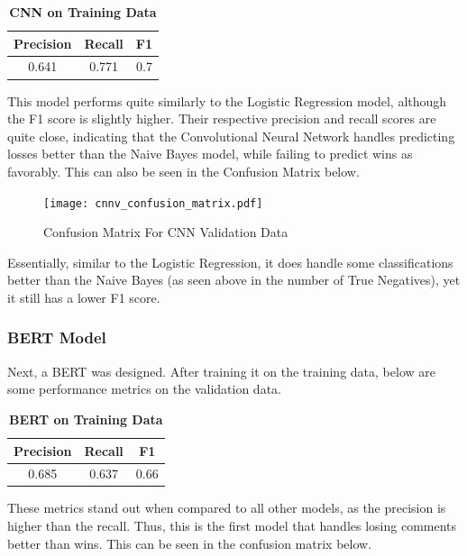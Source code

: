 \documentclass[twocolumn]{article}
\begin{document}
\begin{table}[H]
\centering %
\caption{\textbf{CNN on Training Data}} 

\begin{tabular}{ccc} 
\toprule
Precision & Recall & F1 \\ 
\midrule
0.641 & 0.771 & 0.7 \\
\bottomrule
\end{tabular}
\end{table}

This model performs quite similarly to the Logistic Regression model, although the F1 score is slightly higher. Their respective precision and recall scores are quite close, indicating that the Convolutional Neural Network handles predicting losses better than the Naive Bayes model, while failing to predict wins as favorably. This can also be seen in the Confusion Matrix below.

\begin{figure}[H]
    \centering
    \texttt{[image: cnnv\_confusion\_matrix.pdf]}
    \caption{Confusion Matrix For CNN Validation Data}
\end{figure}

Essentially, similar to the Logistic Regression, it does handle some classifications better than the Naive Bayes (as seen above in the number of True Negatives), yet it still has a lower F1 score.

\subsubsection{BERT Model}

Next, a BERT was designed. After training it on the training data, below are some performance metrics on the validation data.

\begin{table}[H]
\centering %
\caption{\textbf{BERT on Training Data}} 

\begin{tabular}{ccc} 
\toprule
Precision & Recall & F1 \\ 
\midrule
0.685 & 0.637 & 0.66 \\
\bottomrule
\end{tabular}
\end{table}

These metrics stand out when compared to all other models, as the precision is higher than the recall. Thus, this is the first model that handles losing comments better than wins. This can be seen in the confusion matrix below.
\end{document}
